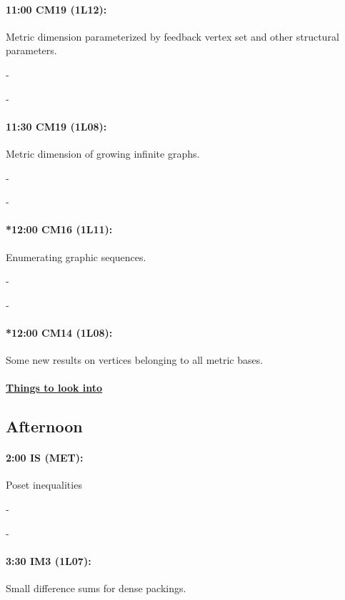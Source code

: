 \documentclass[12]{article}
\theoremstyle{definition}
\begin{document}
	\paragraph{11:00 CM19 (1L12):} Metric dimension parameterized by feedback vertex set and other structural parameters.
	
	-
	
	-
	
	\paragraph{11:30 CM19 (1L08):} Metric dimension of growing infinite graphs.
	
	-
	
	-
	
	\paragraph{*12:00 CM16 (1L11):} Enumerating graphic sequences.
	
	-
	
	-
	
	\paragraph{*12:00 CM14 (1L08):} Some new results on vertices belonging to all metric bases.
	
	\begin{center} 
		\item\paragraph{\underline{Things to look into}} 
	\end{center}

	
	\newpage
	
	\subsection{Afternoon}
	\paragraph{2:00 IS (MET):} Poset inequalities
	
	-
	
	-
	
	\paragraph{3:30 IM3 (1L07):} Small difference sums for dense packings.
	
\end{document}
